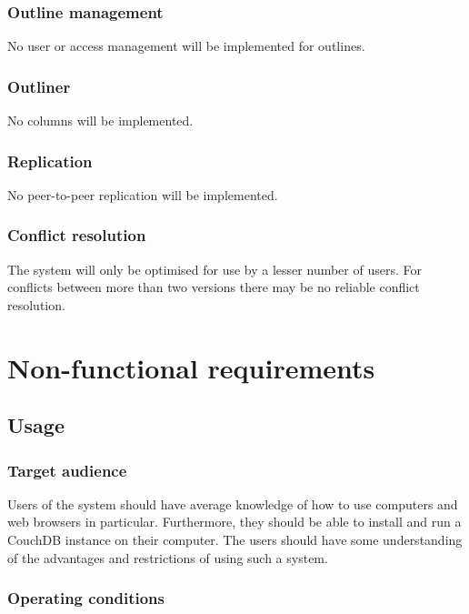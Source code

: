 \subsubsection{Outline management}

No user or access management will be implemented for outlines.

\subsubsection{Outliner}

No columns will be implemented.

\subsubsection{Replication}

No peer-to-peer replication will be implemented.

\subsubsection{Conflict resolution}

The system will only be optimised for use by a lesser number of users. For conflicts between more than two versions there may be no reliable conflict resolution.

\section{Non-functional requirements}

\subsection{Usage}
\label{subsec:einsatz}

\subsubsection{Target audience}

Users of the system should have average knowledge of how to use computers and web browsers in particular. Furthermore, they should be able to install and run a CouchDB instance on their computer. The users should have some understanding of the advantages and restrictions of using such a system.

\subsubsection{Operating conditions}

